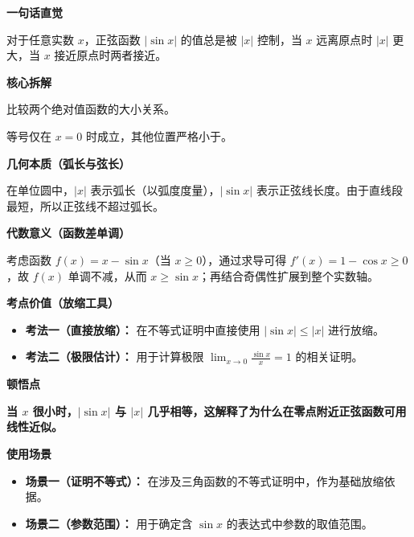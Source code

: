 \begin{explanationbox}
\textbf{\textcolor{CExplanation}{一句话直觉}}

对于任意实数 $x$，正弦函数 $|\sin x|$ 的值总是被 $|x|$ 控制，当 $x$ 远离原点时 $|x|$ 更大，当 $x$ 接近原点时两者接近。

\medskip
\textbf{\textcolor{CExplanation}{核心拆解}}
\begin{description}[style=nextline, leftmargin=2.8em, labelsep=0.5em, itemsep=0.45em]
    \item[\textbf{要点一（绝对值比较）：}] 比较两个绝对值函数的大小关系。
    \item[\textbf{要点二（取等唯一）：}] 等号仅在 $x=0$ 时成立，其他位置严格小于。
\end{description}

\medskip
\textbf{\textcolor{CExplanation}{几何本质（弧长与弦长）}}

在单位圆中，$|x|$ 表示弧长（以弧度度量），$|\sin x|$ 表示正弦线长度。由于直线段最短，所以正弦线不超过弧长。

\medskip
\textbf{\textcolor{CExplanation}{代数意义（函数差单调）}}

考虑函数 $f(x)=x-\sin x$（当 $x\ge 0$），通过求导可得 $f'(x)=1-\cos x\ge 0$，故 $f(x)$ 单调不减，从而 $x\ge \sin x$；再结合奇偶性扩展到整个实数轴。

\medskip
\textbf{\textcolor{CExplanation}{考点价值（放缩工具）}}
\begin{itemize}[leftmargin=*, itemsep=0.5em, topsep=0.4em]
    \item \textbf{考法一（直接放缩）：} 在不等式证明中直接使用 $|\sin x|\le |x|$ 进行放缩。
    \item \textbf{考法二（极限估计）：} 用于计算极限 $\lim_{x\to 0}\frac{\sin x}{x}=1$ 的相关证明。
\end{itemize}

\medskip
\textbf{\textcolor{CExplanation}{顿悟点}}

\textbf{当 $x$ 很小时，$|\sin x|$ 与 $|x|$ 几乎相等，这解释了为什么在零点附近正弦函数可用线性近似。}

\medskip
\textbf{\textcolor{CExplanation}{使用场景}}
\begin{itemize}[leftmargin=*, itemsep=0.5em, topsep=0.4em]
    \item \textbf{场景一（证明不等式）：} 在涉及三角函数的不等式证明中，作为基础放缩依据。
    \item \textbf{场景二（参数范围）：} 用于确定含 $\sin x$ 的表达式中参数的取值范围。
\end{itemize}
\end{explanationbox}
